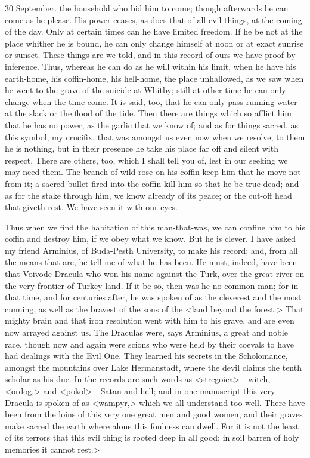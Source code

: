 \begin{diary}{30 September.}
the household who bid him to come; though afterwards he can come as he please. His power ceases, as does that of all evil things, at the coming of the day. Only at certain times can he have limited freedom. If he be not at the place whither he is bound, he can only change himself at noon or at exact sunrise or sunset. These things are we told, and in this record of ours we have proof by inference. Thus, whereas he can do as he will within his limit, when he have his earth-home, his coffin-home, his hell-home, the place unhallowed, as we saw when he went to the grave of the suicide at Whitby; still at other time he can only change when the time come. It is said, too, that he can only pass running water at the slack or the flood of the tide. Then there are things which so afflict him that he has no power, as the garlic that we know of; and as for things sacred, as this symbol, my crucifix, that was amongst us even now when we resolve, to them he is nothing, but in their presence he take his place far off and silent with respect. There are others, too, which I shall tell you of, lest in our seeking we may need them. The branch of wild rose on his coffin keep him that he move not from it; a sacred bullet fired into the coffin kill him so that he be true dead; and as for the stake through him, we know already of its peace; or the cut-off head that giveth rest. We have seen it with our eyes.

Thus when we find the habitation of this man-that-was, we can confine him to his coffin and destroy him, if we obey what we know. But he is clever. I have asked my friend Arminius, of Buda-Pesth University, to make his record; and, from all the means that are, he tell me of what he has been. He must, indeed, have been that Voivode Dracula who won his name against the Turk, over the great river on the very frontier of Turkey-land. If it be so, then was he no common man; for in that time, and for centuries after, he was spoken of as the cleverest and the most cunning, as well as the bravest of the sons of the <land beyond the forest.> That mighty brain and that iron resolution went with him to his grave, and are even now arrayed against us. The Draculas were, says Arminius, a great and noble race, though now and again were scions who were held by their coevals to have had dealings with the Evil One. They learned his secrets in the Scholomance, amongst the mountains over Lake Hermanstadt, where the devil claims the tenth scholar as his due. In the records are such words as <stregoica>—witch, <ordog,> and <pokol>—Satan and hell; and in one manuscript this very Dracula is spoken of as <wampyr,> which we all understand too well. There have been from the loins of this very one great men and good women, and their graves make sacred the earth where alone this foulness can dwell. For it is not the least of its terrors that this evil thing is rooted deep in all good; in soil barren of holy memories it cannot rest.>


\end{diary}
